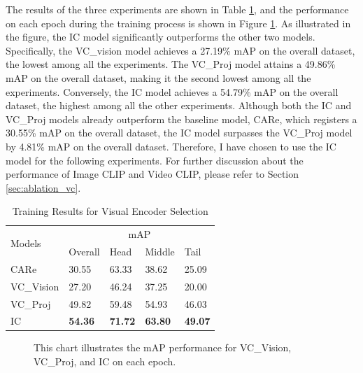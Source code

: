 The results of the three experiments are shown in Table \ref{tab:resultsbackbone}, and the performance on each epoch during the training process is shown in Figure \ref{fig:tp_backbone}. As illustrated in the figure, the IC model significantly outperforms the other two models. Specifically, the VC\_vision model achieves a 27.19\% mAP on the overall dataset, the lowest among all the experiments. The VC\_Proj model attains a 49.86\% mAP on the overall dataset, making it the second lowest among all the experiments. Conversely, the IC model achieves a 54.79\% mAP on the overall dataset, the highest among all the other experiments. Although both the IC and VC\_Proj models already outperform the baseline model, CARe, which registers a 30.55\% mAP on the overall dataset, the IC model surpasses the VC\_Proj model by 4.81\% mAP on the overall dataset. Therefore, I have chosen to use the IC model for the following experiments. For further discussion about the performance of Image CLIP and Video CLIP, please refer to Section \ref{sec:ablation_vc}.

\begin{table}[ht]
    \centering
    \caption{Training Results for Visual Encoder Selection}
    \label{tab:resultsbackbone}
    \begin{tabular}{lllll}
        \toprule
        \multirow{2}{*}{Models} & \multicolumn{4}{c}{mAP} \\
        \cmidrule{2-5} 
        {} & Overall & Head  & Middle & Tail \\
        \midrule
        CARe        & 30.55   & 63.33 & 38.62 & 25.09 \\
        VC\_Vision  & 27.20   & 46.24 & 37.25 & 20.00 \\
        VC\_Proj    & 49.82   & 59.48 & 54.93 & 46.03 \\
        IC          & \textbf{54.36} & \textbf{71.72} & \textbf{63.80} & \textbf{49.07} \\
        \bottomrule
    \end{tabular}
\end{table}


\begin{figure}[ht]
    \centering
    \resizebox{1.0\textwidth}{!}{}
    \caption[mAP performance for VC\_Vision, VC\_Proj, and IC on each epoch]{This chart illustrates the mAP performance for VC\_Vision, VC\_Proj, and IC on each epoch.}
    \label{fig:tp_backbone}
\end{figure}

